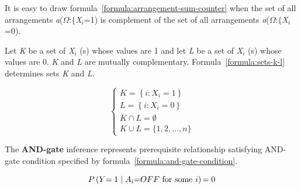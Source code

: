 \documentclass{article}
\numberwithin{equation}{section}
\numberwithin{figure}{section}
\numberwithin{table}{section}
\begin{document}
It is easy to draw formula~\ref{formula:arrangement-sum-counter} when the set of all arrangements \textit{a}($\Omega$:$\{$\textit{X${}_{i}$}=1) is complement of the set of all arrangements \textit{a}($\Omega$:$\{$\textit{X${}_{i}$}=0).

Let \textit{K} be a set of \textit{X${}_{i}$} (s) whose values are 1 and let \textit{L} be a set of \textit{X${}_{i}$} (s) whose values are 0. \textit{K} and \textit{L} are mutually complementary. Formula~\ref{formula:sets-k-l} determines sets \textit{K} and \textit{L}.

\begin{equation}
\left\{ \begin{array}{l}
K=\left\{i:X_i=1\right\} \\ 
L=\left\{i:X_i=0\right\} \\ 
K\cap L=\emptyset  \\ 
K\cup L=\{1,2,\dots ,n\} \end{array}
\right.
\label{formula:sets-k-l}
\end{equation}

The \textbf{AND-gate} inference represents prerequisite relationship satisfying AND-gate condition specified by formula~\ref{formula:and-gate-condition}.

\begin{equation} 
P\left(Y\mathrm{=1}\mathrel{\left|\vphantom{Y\mathrm{=1} A_i\mathrm{=}OFF\mathrm{\ for\ some\ }i}\right.\kern-\nulldelimiterspace}A_i\mathrm{=}OFF\mathrm{\ for\ some\ }i\right)\mathrm{=0}
\label{formula:and-gate-condition}
\end{equation}
\end{document}
